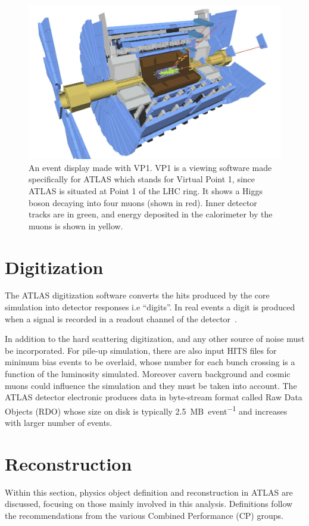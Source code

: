 \begin{figure}[tp]
\centering
\includegraphics[width=.75\textwidth]{MCSample/simulation}
\caption{An event display made with VP1. VP1 is a viewing software made specifically for ATLAS which stands for Virtual Point 1, since ATLAS is situated at Point 1 of the LHC ring. It shows a Higgs boson decaying into four muons (shown in red). Inner detector tracks are in green, and energy deposited in the calorimeter by the muons is shown in yellow.}
\label{fig:simulation}
\end{figure}

\section{Digitization}
The ATLAS digitization software converts the hits produced by the core simulation into detector responses i.e ``digits''. In real events a digit is produced when a signal is recorded in a readout channel of the detector~\cite{simulation}.

In addition to the hard scattering digitization, \pileup and any other source of noise must be incorporated. For pile-up simulation, there are also input HITS files for minimum bias events to be overlaid, whose number for each bunch crossing is a function of the luminosity simulated. Moreover cavern background and cosmic muons could influence the simulation and they must be taken into account.
The ATLAS detector electronic produces data in byte-stream format called Raw Data Objects (RDO) whose size on disk is typically \SI{2.5}{MB\per event} and increases with larger number of \pileup events.

\section{Reconstruction}
\label{sec:recoreal}

Within this section, physics object definition and reconstruction in ATLAS are discussed, focusing on those mainly involved in this analysis. Definitions follow the recommendations from the various Combined Performance (CP) groups.

